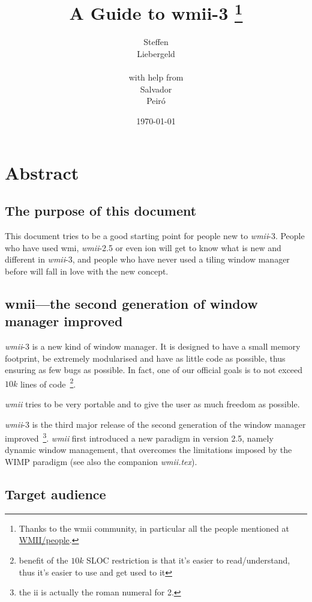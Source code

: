 \documentclass[12pt,a4paper]{article} %
\date{\today}
\author{
Steffen\\Liebergeld \\\\
\small{with help from}\\
Salvador\\Peir\'o
}
\title{A Guide to wmii-3%
\thanks{Thanks to the wmii community, in particular all the 
people mentioned at \href{http://wmii.de/index.php/WMII/People}{WMII/people}.}
}
\newcommand{\wmii}{\emph{wmii}}
\begin{document}
\maketitle

\tableofcontents

\newpage

\section{Abstract}

  \subsection{The purpose of this document}

    This document tries to be a good starting point for people new to
    \wmii-3.  People who have used wmi, \wmii-2.5 or even ion will get
    to know what is new and different in \wmii-3, and people who have
    never used a tiling window manager before will fall in love with
    the new concept.
  
  \subsection{wmii---the second generation of window manager improved}

    \wmii-3 is a new kind of window manager. It is designed to have a
    small memory footprint, be extremely modularised and have as
    little code as possible, thus ensuring as few bugs as possible. In
    fact, one of our official goals is to not exceed $10 k$ lines of
    code~\footnote{ benefit of the $10 k$ SLOC restriction is that
    it's easier to read/understand, thus it's easier to use and get
    used to it}.

    \wmii{} tries to be very portable and to give the user as much
    freedom as possible.

    \wmii-3 is the third major release of the second generation of the
    window manager improved~\footnote{ the ii is actually the roman
    numeral for 2.}.  \wmii{} first introduced a new paradigm in version
    2.5, namely dynamic window management, that overcomes the
    limitations imposed by the WIMP paradigm (see also the companion
    \emph{wmii.tex}).
  
  \subsection{Target audience}
\end{document}
